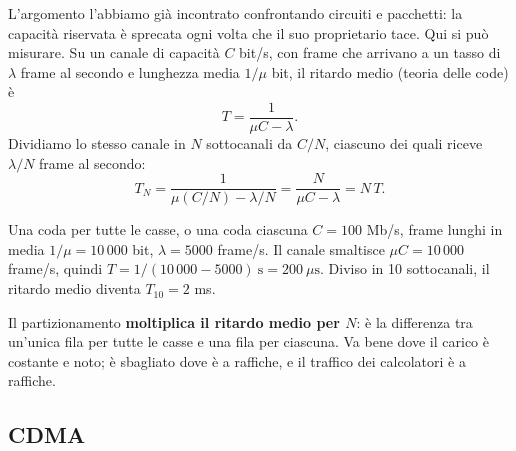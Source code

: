 L'argomento l'abbiamo già incontrato confrontando circuiti e pacchetti: la capacità riservata è sprecata ogni volta che il suo
proprietario tace. Qui si può misurare. Su un canale di capacità $C$ bit/s, con frame che arrivano a un tasso di $\lambda$ frame al
secondo e lunghezza media $1/\mu$ bit, il ritardo medio (teoria delle code) è
$$T = \frac{1}{\mu C - \lambda}.$$
Dividiamo lo stesso canale in $N$ sottocanali da $C/N$, ciascuno dei quali riceve $\lambda/N$ frame al secondo:
$$T_N = \frac{1}{\mu (C/N) - \lambda/N} = \frac{N}{\mu C - \lambda} = N\,T.$$

\begin{esempio}{Una coda per tutte le casse, o una coda ciascuna}
$C = 100$ Mb/s, frame lunghi in media $1/\mu = 10\,000$ bit, $\lambda = 5000$ frame/s. Il canale smaltisce $\mu C = 10\,000$ frame/s,
quindi $T = 1/(10\,000 - 5000)\ \text{s} = 200\ \mu\text{s}$. Diviso in 10 sottocanali, il ritardo medio diventa $T_{10} = 2$ ms.
\end{esempio}

Il partizionamento \textbf{moltiplica il ritardo medio per $N$}: è la differenza tra un'unica fila per tutte le casse e una fila per
ciascuna. Va bene dove il carico è costante e noto; è sbagliato dove è a raffiche, e il traffico dei calcolatori è a raffiche.

\subsection{CDMA}



